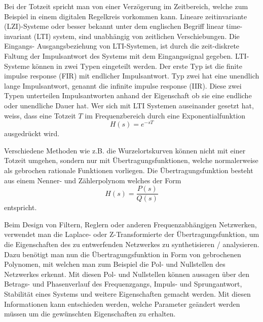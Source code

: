 Bei der Totzeit spricht man von einer Verzögerung im Zeitbereich, welche zum Beispiel in einem digitalen Regelkreis vorkommen kann.
Lineare zeitinvariante (LZI)-Systeme oder besser bekannt unter dem englischen Begriff linear time-invariant (LTI) system, sind unabhängig von zeitlichen Verschiebungen. 
Die Eingangs- Ausgangsbeziehung von LTI-Systemen, ist durch die zeit-diskrete Faltung der Impulsantwort des Systems mit dem Eingangssignal gegeben. 
LTI-Systeme können in zwei Typen  eingeteilt werden.
Der erste Typ ist die finite impulse response (FIR) mit endlicher Impulsantwort.
Typ zwei hat eine unendlich lange Impulsantwort, genannt die infinite impulse response (IIR).
Diese zwei Typen unterteilen Impulsantworten anhand der Eigenschaft ob sie eine endliche oder unendliche Dauer hat. 
Wer sich mit LTI Systemen auseinander gesetzt hat, weiss, dass eine Totzeit $T$ im Frequenzbereich durch eine Exponentialfunktion
\begin{equation*}
H(s) = e^{-sT}
\end{equation*}
ausgedrückt wird.

Verschiedene Methoden wie z.B. die Wurzelortskurven können nicht mit einer Totzeit umgehen, sondern nur mit Übertragungsfunktionen, welche normalerweise als gebrochen rationale Funktionen vorliegen.
Die Übertragungsfunktion besteht aus einem Nenner- und Zählerpolynom welches der Form
\begin{equation*}
H(s)=\frac{P(s)}{Q(s)}
\end{equation*}
entspricht.

Beim Design von Filtern, Reglern oder anderen Frequenzabhängigen Netzwerken, verwendet man die Laplace- oder Z-Transformierte der Übertragungsfunktion, um die Eigenschaften des zu entwerfenden Netzwerkes zu synthetisieren / analysieren.
Dazu benötigt man nun die Übertragungsfunktion in Form von gebrochenen Polynomen, mit welchen man zum Beispiel die Pol- und Nullstellen des Netzwerkes erkennt.
Mit diesen Pol- und Nullstellen können aussagen über den Betrags- und Phasenverlauf des Frequenzgangs, Impuls- und Sprungantwort, Stabilität eines Systems und weitere Eigenschaften gemacht werden.
Mit diesen Informationen kann entschieden werden, welche Parameter geändert werden müssen um die gewünschten Eigenschaften zu erhalten.
 
